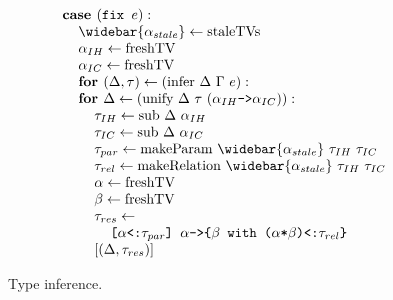 \documentclass[acmsmall]{acmart}
\begin{document}
\begin{figure*}[h]
\[\begin{array}[t]{@{} l}
    \\

    \I \B{case } (\code{fix $e$}) :  
    \\
    \I\I \widebar{\alpha_{stale}} \leftarrow \F{staleTVs}
    \\
    \I\I \alpha_{IH} \leftarrow \F{freshTV}
    \\
    \I\I \alpha_{IC} \leftarrow \F{freshTV}
    \\
    \I\I \B{for } (\Delta, \tau) \leftarrow (\F{infer}\ \Delta\ \Gamma\ e):
    \\
    \I\I \B{for } \Delta \leftarrow (\F{unify}\ \Delta\ \tau\ (\code{$\alpha_{IH}$->$\alpha_{IC}$})): 
    \\
    \I\I\I \tau_{IH} \leftarrow \F{sub}\ \Delta\ \alpha_{IH}  
    \\
    \I\I\I \tau_{IC} \leftarrow \F{sub}\ \Delta\ \alpha_{IC}
    \\
    \I\I\I \tau_{par} \leftarrow \F{makeParam}\ \widebar{\alpha_{stale}}\ \tau_{IH}\ \tau_{IC}
    \\
    \I\I\I \tau_{rel} \leftarrow \F{makeRelation}\ \widebar{\alpha_{stale}}\ \tau_{IH}\ \tau_{IC}
    \\
    \I\I\I \alpha \leftarrow \F{freshTV}
    \\
    \I\I\I \beta \leftarrow \F{freshTV}
    \\
    \I\I\I \tau_{res} \leftarrow
    \\
    \I\I\I\I \code{[$\alpha$<:$\tau_{par}$] $\alpha$->\{$\beta$ with ($\alpha$*$\beta$)<:$\tau_{rel}$\}}
    \\
    \I\I\I [(\Delta, \tau_{res})]

\end{array}
\]
\caption{Type inference.}
\end{figure*}
\end{document}
